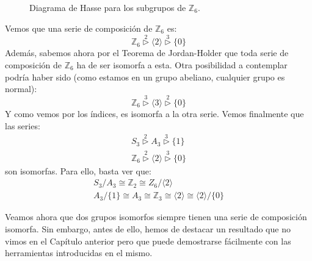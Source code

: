 \begin{ejemplo}
\begin{figure}[H]
                \caption{Diagrama de Hasse para los subgrupos de $\mathbb{Z}_6$.}
            \end{figure}
            Vemos que una serie de composición de $\mathbb{Z}_6$ es:
            \begin{equation*}
                \mathbb{Z}_6 \stackrel{2}{\rhd} \langle 2 \rangle  \stackrel{3}{\rhd} \{0\}
            \end{equation*}
            Además, sabemos ahora por el Teorema de Jordan-Holder que toda serie de composición de $\mathbb{Z}_6$ ha de ser isomorfa a esta. Otra posibilidad a contemplar podría haber sido (como estamos en un grupo abeliano, cualquier grupo es normal):
            \begin{equation*}
                \mathbb{Z}_6 \stackrel{3}{\rhd} \langle 3 \rangle  \stackrel{2}{\rhd} \{0\}
            \end{equation*}
            Y como vemos por los índices, es isomorfa a la otra serie. Vemos finalmente que las series:
            \begin{gather*}
                S_3 \stackrel{2}{\rhd} A_3 \stackrel{3}{\rhd} \{1\} \\
                \mathbb{Z}_6 \stackrel{2}{\rhd} \langle 2 \rangle  \stackrel{3}{\rhd} \{0\} 
            \end{gather*}
            son isomorfas. Para ello, basta ver que:
            \begin{gather*}
                S_3/A_3 \cong \mathbb{Z}_2 \cong Z_6/\langle 2 \rangle  \\
                A_3/\{1\} \cong A_3 \cong \mathbb{Z}_3 \cong \langle 2 \rangle  \cong \langle 2 \rangle /\{0\}
            \end{gather*}
\end{ejemplo}

\noindent
Veamos ahora que dos grupos isomorfos siempre tienen una serie de composición isomorfa. Sin embargo, antes de ello, hemos de destacar un resultado que no vimos en el Capítulo anterior pero que puede demostrarse fácilmente con las herramientas introducidas en el mismo.

